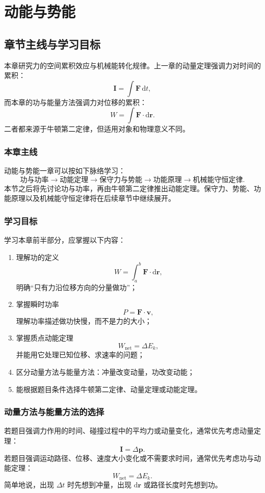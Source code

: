 \chapter{动能与势能}

\section{章节主线与学习目标}

本章研究力的空间累积效应与机械能转化规律。上一章的动量定理强调力对时间的累积：
\[
    \boldsymbol I=\int \boldsymbol F\,\mathrm dt,
\]
而本章的功与能量方法强调力对位移的累积：
\[
    W=\int \boldsymbol F\cdot\mathrm d\boldsymbol r .
\]
二者都来源于牛顿第二定律，但适用对象和物理意义不同。

\subsection{本章主线}

动能与势能一章可以按如下脉络学习：
\[
    \text{功与功率}
    \longrightarrow
    \text{动能定理}
    \longrightarrow
    \text{保守力与势能}
    \longrightarrow
    \text{功能原理}
    \longrightarrow
    \text{机械能守恒定律}.
\]
本节之后将先讨论功与功率，再由牛顿第二定律推出动能定理。保守力、势能、功能原理以及机械能守恒定律将在后续章节中继续展开。

\subsection{学习目标}

学习本章前半部分，应掌握以下内容：

\begin{enumerate}
    \item 理解功的定义
    \[
        W=\int_a^b\boldsymbol F\cdot\mathrm d\boldsymbol r,
    \]
    明确“只有力沿位移方向的分量做功”；
    \item 掌握瞬时功率
    \[
        P=\boldsymbol F\cdot\boldsymbol v,
    \]
    理解功率描述做功快慢，而不是力的大小；
    \item 掌握质点动能定理
    \[
        W_{\mathrm{net}}=\Delta E_k,
    \]
    并能用它处理已知位移、求速率的问题；
    \item 区分动量方法与能量方法：冲量改变动量，功改变动能；
    \item 能根据题目条件选择牛顿第二定律、动量定理或动能定理。
\end{enumerate}

\subsection{动量方法与能量方法的选择}

若题目强调力作用的时间、碰撞过程中的平均力或动量变化，通常优先考虑动量定理：
\[
    \boldsymbol I=\Delta\boldsymbol p.
\]
若题目强调运动路径、位移、速度大小变化或不需要求时间，通常优先考虑功与动能定理：
\[
    W_{\mathrm{net}}=\Delta E_k.
\]
简单地说，出现 $\Delta t$ 时先想到冲量，出现 $\mathrm d\boldsymbol r$ 或路径长度时先想到功。
